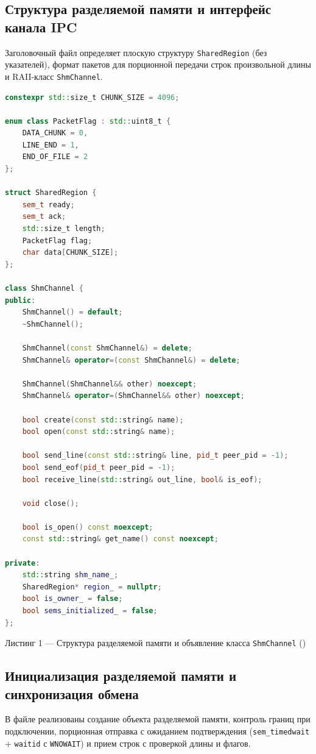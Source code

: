\documentclass[11pt, a4paper]{article}
\begin{document}
\subsection{Структура разделяемой памяти и интерфейс канала IPC}
Заголовочный файл  определяет плоскую структуру \texttt{SharedRegion} (без указателей), формат пакетов для порционной передачи строк произвольной длины и RAII-класс \texttt{ShmChannel}.

\begin{lstlisting}[language=C++]
constexpr std::size_t CHUNK_SIZE = 4096;

enum class PacketFlag : std::uint8_t {
    DATA_CHUNK = 0,
    LINE_END = 1,
    END_OF_FILE = 2
};

struct SharedRegion {
    sem_t ready;
    sem_t ack;
    std::size_t length;
    PacketFlag flag;
    char data[CHUNK_SIZE];
};

class ShmChannel {
public:
    ShmChannel() = default;
    ~ShmChannel();

    ShmChannel(const ShmChannel&) = delete;
    ShmChannel& operator=(const ShmChannel&) = delete;

    ShmChannel(ShmChannel&& other) noexcept;
    ShmChannel& operator=(ShmChannel&& other) noexcept;

    bool create(const std::string& name);
    bool open(const std::string& name);

    bool send_line(const std::string& line, pid_t peer_pid = -1);
    bool send_eof(pid_t peer_pid = -1);
    bool receive_line(std::string& out_line, bool& is_eof);

    void close();

    bool is_open() const noexcept;
    const std::string& get_name() const noexcept;

private:
    std::string shm_name_;
    SharedRegion* region_ = nullptr;
    bool is_owner_ = false;
    bool sems_initialized_ = false;
};
\end{lstlisting}
\begin{center}
    \small Листинг 1 — Структура разделяемой памяти и объявление класса \texttt{ShmChannel} ()
\end{center}

\subsection{Инициализация разделяемой памяти и синхронизация обмена}
В файле  реализованы создание объекта разделяемой памяти, контроль границ при подключении, порционная отправка с ожиданием подтверждения (\texttt{sem\_timedwait} + \texttt{waitid} с \texttt{WNOWAIT}) и прием строк с проверкой длины и флагов.
\end{document}
